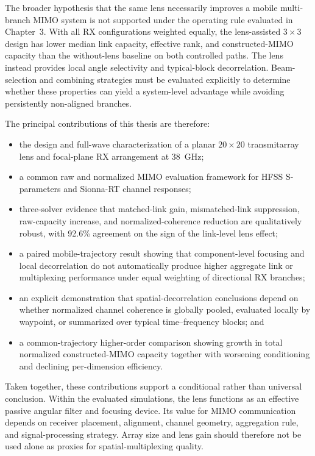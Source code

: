 The broader hypothesis that the same lens necessarily improves a mobile multi-branch MIMO system is not supported under the operating rule evaluated in Chapter~3. With all RX configurations weighted equally, the lens-assisted $3\times3$ design has lower median link capacity, effective rank, and constructed-MIMO capacity than the without-lens baseline on both controlled paths. The lens instead provides local angle selectivity and typical-block decorrelation. Beam-selection and combining strategies must be evaluated explicitly to determine whether these properties can yield a system-level advantage while avoiding persistently non-aligned branches.

The principal contributions of this thesis are therefore:
\begin{itemize}
    \item the design and full-wave characterization of a planar $20\times20$ transmitarray lens and focal-plane RX arrangement at 38~GHz;
    \item a common raw and normalized MIMO evaluation framework for HFSS S-parameters and Sionna-RT channel responses;
    \item three-solver evidence that matched-link gain, mismatched-link suppression, raw-capacity increase, and normalized-coherence reduction are qualitatively robust, with 92.6\% agreement on the sign of the link-level lens effect;
    \item a paired mobile-trajectory result showing that component-level focusing and local decorrelation do not automatically produce higher aggregate link or multiplexing performance under equal weighting of directional RX branches;
    \item an explicit demonstration that spatial-decorrelation conclusions depend on whether normalized channel coherence is globally pooled, evaluated locally by waypoint, or summarized over typical time--frequency blocks; and
    \item a common-trajectory higher-order comparison showing growth in total normalized constructed-MIMO capacity together with worsening conditioning and declining per-dimension efficiency.
\end{itemize}

Taken together, these contributions support a conditional rather than universal conclusion. Within the evaluated simulations, the lens functions as an effective passive angular filter and focusing device. Its value for MIMO communication depends on receiver placement, alignment, channel geometry, aggregation rule, and signal-processing strategy. Array size and lens gain should therefore not be used alone as proxies for spatial-multiplexing quality.

